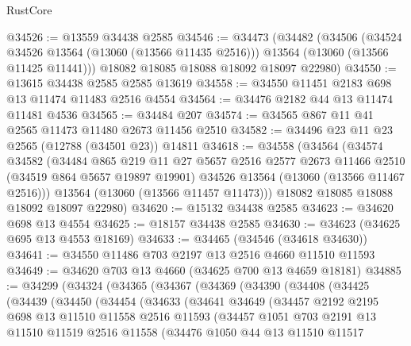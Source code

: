 \begin{lexlean}{RustCore}
\begin{coremodule}
@34526 := @13559 @34438 @2585
@34546 := @34473
    (@34482
      (@34506
        (@34524 @34526 @13564 (@13060 (@13566 @11435 @2516)))
        @13564
        (@13060 (@13566 @11425 @11441)))
      @18082
      @18085
      @18088
      @18092
      @18097
      @22980)
@34550 := @13615 @34438 @2585 @2585 @13619
@34558 := @34550 @11451 @2183 @698 @13 @11474 @11483 @2516 @4554
@34564 := @34476 @2182 @44 @13 @11474 @11481 @4536
@34565 := @34484 @207
@34574 := @34565 @867 @11 @41 @2565 @11473 @11480 @2673 @11456 @2510
@34582 := @34496 @23 @11 @23 @2565 (@12788 (@34501 @23)) @14811
@34618 := @34558
    (@34564
      (@34574
        @34582
        (@34484
          @865
          @219
          @11
          @27
          @5657
          @2516
          @2577
          @2673
          @11466
          @2510
          (@34519 @864 @5657 @19897 @19901)
          @34526
          @13564
          (@13060 (@13566 @11467 @2516)))
        @13564
        (@13060 (@13566 @11457 @11473)))
      @18082
      @18085
      @18088
      @18092
      @18097
      @22980)
@34620 := @15132 @34438 @2585
@34623 := @34620 @698 @13 @4554
@34625 := @18157 @34438 @2585
@34630 := @34623 (@34625 @695 @13 @4553 @18169)
@34633 := @34465 (@34546 (@34618 @34630))
@34641 := @34550 @11486 @703 @2197 @13 @2516 @4660 @11510 @11593
@34649 := @34620 @703 @13 @4660 (@34625 @700 @13 @4659 @18181)
@34885 := @34299
    (@34324
      (@34365
        (@34367
          (@34369
            (@34390
              (@34408
                (@34425
                  (@34439
                    (@34450
                      (@34454
                        (@34633
                          (@34641
                            @34649
                            (@34457
                              @2192
                              @2195
                              @698
                              @13
                              @11510
                              @11558
                              @2516
                              @11593
                              (@34457
                                @1051
                                @703
                                @2191
                                @13
                                @11510
                                @11519
                                @2516
                                @11558
                                (@34476
                                  @1050
                                  @44
                                  @13
                                  @11510
                                  @11517

\end{coremodule}
\end{lexlean}
